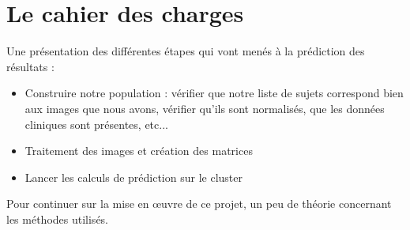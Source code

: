 \section{Le cahier des charges}

Une présentation des différentes étapes qui vont menés à la prédiction des résultats :

\begin{itemize}
	\item Construire notre population : vérifier que notre liste de sujets correspond bien aux images que nous avons, vérifier qu'ils sont normalisés, que les données cliniques sont présentes, etc... 
	\item Traitement des images et création des matrices
	\item Lancer les calculs de prédiction sur le cluster
\end{itemize}

Pour continuer sur la mise en œuvre de ce projet, un peu de théorie concernant les méthodes utilisés. 